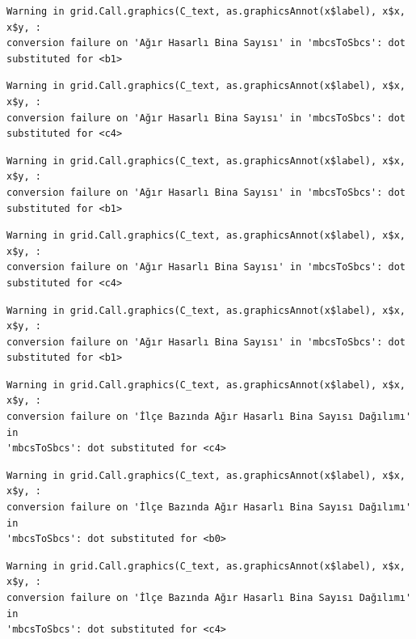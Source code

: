\documentclass[
  11pt,
  a4paper,
  DIV=11,
  numbers=noendperiod]{scrartcl}
\begin{document}
\begin{verbatim}
Warning in grid.Call.graphics(C_text, as.graphicsAnnot(x$label), x$x, x$y, :
conversion failure on 'Ağır Hasarlı Bina Sayısı' in 'mbcsToSbcs': dot
substituted for <b1>
\end{verbatim}

\begin{verbatim}
Warning in grid.Call.graphics(C_text, as.graphicsAnnot(x$label), x$x, x$y, :
conversion failure on 'Ağır Hasarlı Bina Sayısı' in 'mbcsToSbcs': dot
substituted for <c4>
\end{verbatim}

\begin{verbatim}
Warning in grid.Call.graphics(C_text, as.graphicsAnnot(x$label), x$x, x$y, :
conversion failure on 'Ağır Hasarlı Bina Sayısı' in 'mbcsToSbcs': dot
substituted for <b1>
\end{verbatim}

\begin{verbatim}
Warning in grid.Call.graphics(C_text, as.graphicsAnnot(x$label), x$x, x$y, :
conversion failure on 'Ağır Hasarlı Bina Sayısı' in 'mbcsToSbcs': dot
substituted for <c4>
\end{verbatim}

\begin{verbatim}
Warning in grid.Call.graphics(C_text, as.graphicsAnnot(x$label), x$x, x$y, :
conversion failure on 'Ağır Hasarlı Bina Sayısı' in 'mbcsToSbcs': dot
substituted for <b1>
\end{verbatim}

\begin{verbatim}
Warning in grid.Call.graphics(C_text, as.graphicsAnnot(x$label), x$x, x$y, :
conversion failure on 'İlçe Bazında Ağır Hasarlı Bina Sayısı Dağılımı' in
'mbcsToSbcs': dot substituted for <c4>
\end{verbatim}

\begin{verbatim}
Warning in grid.Call.graphics(C_text, as.graphicsAnnot(x$label), x$x, x$y, :
conversion failure on 'İlçe Bazında Ağır Hasarlı Bina Sayısı Dağılımı' in
'mbcsToSbcs': dot substituted for <b0>
\end{verbatim}

\begin{verbatim}
Warning in grid.Call.graphics(C_text, as.graphicsAnnot(x$label), x$x, x$y, :
conversion failure on 'İlçe Bazında Ağır Hasarlı Bina Sayısı Dağılımı' in
'mbcsToSbcs': dot substituted for <c4>
\end{verbatim}
\end{document}
